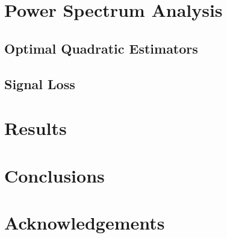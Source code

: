\documentclass[preprint2,numberedappendix,tighten,twocolappendix]{aastex6}  %
\begin{document}
\section{Power Spectrum Analysis}
\label{sec:PS}

\subsection{Optimal Quadratic Estimators}
\label{sec:OQE}

\subsection{Signal Loss}
\label{sec:Sigloss}

\section{Results}
\label{sec:Res}

\section{Conclusions}
\label{sec:Con}

\section{Acknowledgements}
\label{sec:Ack}



\end{document}
